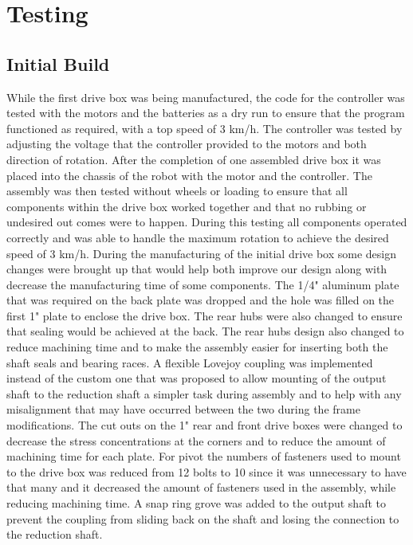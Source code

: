 \section{Testing}
\subsection{Initial Build}
While the first drive box was being manufactured, the code for the controller was tested with the motors and the batteries as a dry run to ensure that the program functioned as required, with a top speed of 3 km/h. The controller was tested by adjusting the voltage that the controller provided to the motors and both direction of rotation. After the completion of one assembled drive box it was placed into the chassis of the robot with the motor and the controller. The assembly was then tested without wheels or loading to ensure that all components within the drive box worked together and that no rubbing or undesired out comes were to happen. During this testing all components operated correctly and was able to handle the maximum rotation to achieve the desired speed of 3 km/h. During the manufacturing of the initial drive box some design changes were brought up that would help both improve our design along with decrease the manufacturing time of some components. The 1/4" aluminum plate that was required on the back plate was dropped and the hole was filled on the first 1" plate to enclose the drive box. The rear hubs were also changed to ensure that sealing would be achieved at the back. The rear hubs design also changed to reduce machining time and to make the assembly easier for inserting both the shaft seals and bearing races. A flexible Lovejoy coupling was implemented instead of the custom one that was proposed to allow mounting of the output shaft to the reduction shaft a simpler task during assembly and to help with any misalignment that may have occurred between the two during the frame modifications. The cut outs on the 1" rear and front drive boxes were changed to decrease the stress concentrations at the corners and to reduce the amount of machining time for each plate. For pivot the numbers of fasteners used to mount to the drive box was reduced from 12 bolts to 10 since it was unnecessary to have that many and it decreased the amount of fasteners used in the assembly, while reducing machining time. A snap ring grove was added to the output shaft to prevent the coupling from sliding back on the shaft and losing the connection to the reduction shaft.

